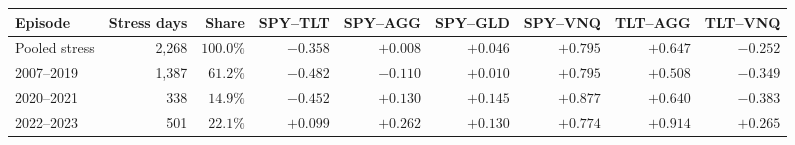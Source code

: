 \begin{tabular}{lrrrrrrrr}
\toprule
Episode & Stress days & Share & SPY--TLT & SPY--AGG & SPY--GLD & SPY--VNQ & TLT--AGG & TLT--VNQ \\
\midrule
Pooled stress & 2,268 & $100.0\%$ & $-0.358$ & $+0.008$ & $+0.046$ & $+0.795$ & $+0.647$ & $-0.252$ \\
\midrule
2007--2019 & 1,387 & $61.2\%$ & $-0.482$ & $-0.110$ & $+0.010$ & $+0.795$ & $+0.508$ & $-0.349$ \\
2020--2021 & 338 & $14.9\%$ & $-0.452$ & $+0.130$ & $+0.145$ & $+0.877$ & $+0.640$ & $-0.383$ \\
2022--2023 & 501 & $22.1\%$ & $+0.099$ & $+0.262$ & $+0.130$ & $+0.774$ & $+0.914$ & $+0.265$ \\
\bottomrule
\end{tabular}
